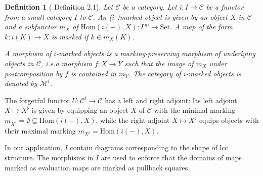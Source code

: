 \documentclass{article}
\newtheorem{definition}{Definition}
\begin{document}
\begin{definition}[\cite{marked-objects} Definition 2.1]
  Let $\mathcal{C}$ be a category.
  Let $i : I \rightarrow \mathcal{C}$ be a functor from a small category $I$ to $\mathcal{C}$.
  An \emph{($i$-)marked object} is given by an object $X$ in $\mathcal{C}$ and a subfunctor $m_X$ of $\mathrm{Hom}(i(-), X) : I^\mathrm{op} \rightarrow \mathrm{Set}$.
  A map of the form $k : i(K) \rightarrow X$ is \emph{marked} if $k \in m_X(K)$.

  A morphism of $i$-marked objects is a marking-preserving morphism of underlying objects in $\mathcal{C}$, i.e.\@ a morphism $f : X \rightarrow Y$ such that the image of $m_X$ under postcomposition by $f$ is contained in $m_Y$.
  The category of $i$-marked objects is denoted by $\mathcal{M}^i$.
\end{definition}

The forgetful functor $U : \mathcal{C}^i \rightarrow \mathcal{C}$ has a left and right adjoint:
Its left adjoint $X \mapsto X^\flat$ is given by equipping an object $X$ of $\mathcal{C}$ with the minimal marking $m_{X^\flat} = \emptyset \subseteq \mathrm{Hom}(i(-), X)$, while the right adjoint $X \mapsto X^\sharp$ equips objects with their maximal marking $m_{X^\sharp} = \mathrm{Hom}(i(-), X)$.

In our application, $I$ contain diagrams corresponding to the shape of lcc structure.
The morphisms in $I$ are used to enforce that the domains of maps marked as evaluation maps are marked as pullback squares.
\end{document}
